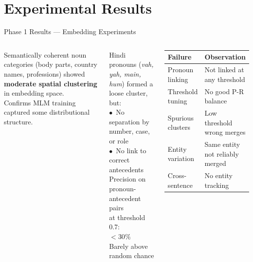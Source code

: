 \documentclass[aspectratio=169]{beamer}
\begin{document}
\section{Experimental Results}

\begin{frame}{Phase 1 Results — Embedding Experiments}
  \begin{columns}[T]
      \begin{tcolorbox}[nbox={Positive Observations}]
        \small
        Semantically coherent noun categories
        (body parts, country names, professions)
        showed \textbf{moderate spatial clustering}
        in embedding space.\\[5pt]
        Confirms MLM training captured
        some distributional structure.
      \end{tcolorbox}

      \vspace{6pt}
      \begin{tcolorbox}[wbox={Critical Failure — Pronouns}]
        \small
        Hindi pronouns (\textit{vah, yah, main, hum})
        formed a loose cluster, but:\\[4pt]
        $\bullet$\ No separation by number, case, or role\\
        $\bullet$\ No link to correct antecedents\\[6pt]
        \centering
        Precision on pronoun-antecedent pairs\\
        at threshold 0.7:\\[3pt]
        \textcolor{red!70!black}{\Large\textbf{$< 30\%$}}\\[2pt]
        \small Barely above random chance
      \end{tcolorbox}

      \begin{tcolorbox}[wbox={Failure Mode Summary}]
        \small
        \renewcommand{\arraystretch}{1.3}
        \begin{tabular}{p{2.5cm} p{3.0cm}}
          \toprule
          \textbf{Failure} & \textbf{Observation}\\
          \midrule
          Pronoun linking & Not linked at any threshold\\
          Threshold tuning & No good P-R balance\\
          Spurious clusters & Low threshold wrong merges\\
          Entity variation & Same entity not reliably merged\\
          Cross-sentence & No entity tracking\\
          \bottomrule
        \end{tabular}
      \end{tcolorbox}


\end{columns}
\end{frame}
\end{document}
